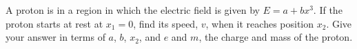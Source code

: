         A proton is in a region in which the electric field is
        given by $E=a+bx^3$. If the proton starts at rest at
        $x_1=0$, find its speed, $v$, when it reaches position
        $x_2$. Give your answer in terms of $a$, $b$, $x_2$, and $e$
        and $m$, the charge and mass of the proton.\answercheck
